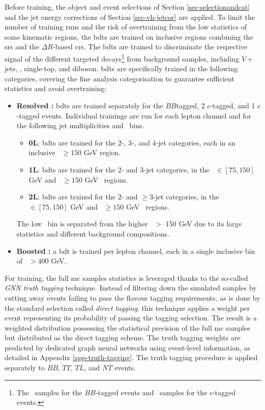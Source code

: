 Before training, the object and event selections of Section \ref{sec-selectionandcat} and the jet energy corrections of Section \ref{sec-vh-jetcor} are applied. To limit the number of training runs and the risk of overtraining from the low statistics of some kinematic regions, the \glspl{bdt} are trained on inclusive regions combining the \glspl{sr} and the $\Delta R$-based \glspl{cr}. The \glspl{bdt} are trained to discriminate the respective signal of the different targeted decays\footnote{The \vhb\ samples for the $BB$-tagged events and \vhc\ samples for the $c$-tagged events.} from background samples, including $V+$jets, \ttb, single-top, and diboson. \glspl{bdt} are specifically trained in the following categories, covering the fine analysis categorisation to guarantee sufficient statistics and avoid overtraining:
\begin{itemize}[leftmargin=*]
  \item \textbf{Resolved \boldvhbc:} \glspl{bdt} are trained separately for the $BB$tagged, 2 $c$-tagged, and 1 $c$-tagged events. Individual trainings are run for each lepton channel and for the following jet multiplicities and \ptv\ bins.
  \begin{itemize}
      \item \textbf{0L}: \glspl{bdt} are trained for the 2-, 3-, and 4-jet categories, each in an inclusive \ptv\ $\geq 150$ GeV region.
      \item \textbf{1L}: \glspl{bdt} are trained for the 2- and 3-jet categories, in the \ptv\ $\in [75, 150]$ GeV and \ptv\ $\geq 150$ GeV \ptv\ regions.
      \item \textbf{2L}: \glspl{bdt} are trained for the 2- and $\geq$3-jet categories, in the \ptv\ $\in [75, 150]$ GeV and \ptv\ $\geq 150$ GeV \ptv\ regions.
  \end{itemize}
  The low \ptv\ bin is separated from the higher \ptv\ $>$ 150 GeV due to its large statistics and different background compositions.
  \item \textbf{Boosted \boldvhbc:} a \gls{bdt} is trained per lepton channel, each in a single inclusive bin of \ptv\ $>400$ GeV.
\end{itemize}

For training, the full \gls{mc} samples statistics is leveraged thanks to the so-called \textit{GNN truth tagging} technique. Instead of filtering down the simulated samples by cutting away events failing to pass the flavour tagging requirements, as is done by the standard selection called \textit{direct tagging}, this technique applies a weight per event representing its probability of passing the tagging selection. The result is a weighted distribution possessing the statistical precision of the full \gls{mc} samples but distributed as the direct tagging scheme. The truth tagging weights are predicted by dedicated graph neural networks using event-level information, as detailed in Appendix \ref{app-truth-tagging}. The truth tagging procedure is applied separately to $BB$, $TT$, $TL$, and $NT$ events. \\

